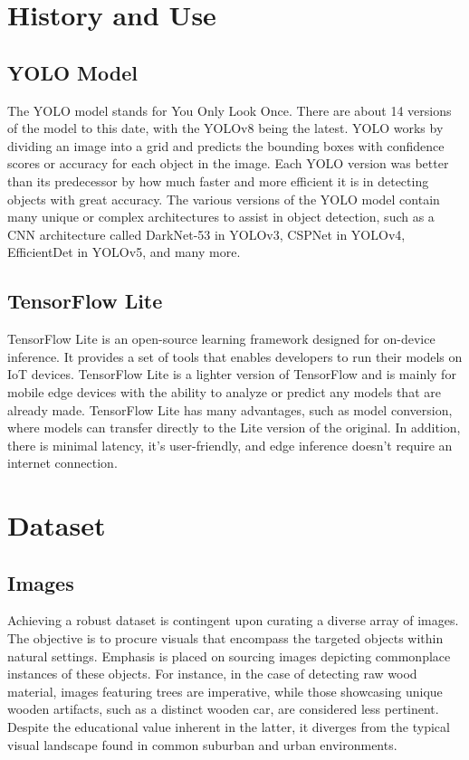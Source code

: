 \documentclass[conference]{IEEEtran}
\begin{document}
\section{History and Use}
\subsection{YOLO Model}
The YOLO model stands for You Only Look Once. There are about 14 versions of the model to this date, with the YOLOv8 being the latest. YOLO works by dividing an image into a grid and predicts the bounding boxes with confidence scores or accuracy for each object in the image.\cite{Sahota_2023} Each YOLO version was better than its predecessor by how much faster and more efficient it is in detecting objects with great accuracy. The various versions of the YOLO model contain many unique or complex architectures to assist in object detection, such as a CNN architecture called DarkNet-53 in YOLOv3, CSPNet in YOLOv4, EfficientDet in YOLOv5, and many more.  

\subsection{TensorFlow Lite}
TensorFlow Lite is an open-source learning framework designed for on-device inference. It provides a set of tools that enables developers to run their models on IoT devices.\cite{Boesch_2021} TensorFlow Lite is a lighter version of TensorFlow and is mainly for mobile edge devices with the ability to analyze or predict any models that are already made. TensorFlow Lite has many advantages, such as model conversion, where models can transfer directly to the Lite version of the original. In addition, there is minimal latency, it's user-friendly, and edge inference doesn't require an internet connection.    


\section{Dataset}
\subsection{Images}
Achieving a robust dataset is contingent upon curating a diverse array of images. The objective is to procure visuals that encompass the targeted objects within natural settings. Emphasis is placed on sourcing images depicting commonplace instances of these objects. For instance, in the case of detecting raw wood material, images featuring trees are imperative, while those showcasing unique wooden artifacts, such as a distinct wooden car, are considered less pertinent. Despite the educational value inherent in the latter, it diverges from the typical visual landscape found in common suburban and urban environments.
\end{document}
